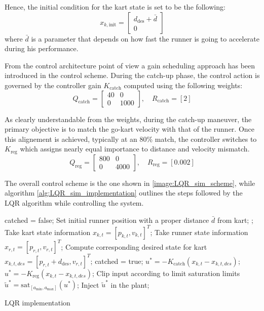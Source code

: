 \documentclass[a4paper,12pt,oneside]{book}
\begin{document}
Hence, the initial condition for the kart state is set to be the following:
\begin{equation}
    x_{k,\text{init}} =
    \begin{bmatrix}
        d_{\text{des}} + \bar{d} \\
        0
    \end{bmatrix}
\end{equation}
where $\bar{d}$ is a parameter that depends on how fast the runner is going to accelerate during his performance. 
 
\bigskip
From the control architecture point of view a gain scheduling approach has been introduced in the control scheme.
During the catch-up phase, the control action is governed by the controller gain $K_{\text{catch}}$ computed using the following weights: 
\begin{equation}
    Q_{\text{catch}} =
    \begin{bmatrix}
        40 & 0 \\
        0 & 1000
    \end{bmatrix},
    \quad
    R_{\text{catch}} = [2]
\end{equation}

As clearly understandable from the weights, during the catch-up maneuver, the primary objective is to match the go-kart velocity with  that of the runner.
Once this alignement is achieved, typically at an 80\% match, the controller switches to $K_{\text{reg}}$ which assigns nearly equal importance to distance and velocity mismatch.
\begin{equation}
    Q_{\text{reg}} =
    \begin{bmatrix}
        800 & 0 \\
        0 & 4000
    \end{bmatrix},
    \quad
    R_{\text{reg}} = [0.002]
\end{equation}

The overall control scheme is the one shown in \ref{image:LQR_sim_scheme}, while algorithm \ref{alg:LQR_sim_implementation} outlines the steps followed by the LQR algorithm while controlling the system.
\begin{algorithm}
\begin{algorithmic}[1]
	\State catched = false;
	\State Set initial runner position with a proper distance $\bar{d}$ from kart;
	;
		\State Take kart state information $x_{k,t} = [p_{k,t}, v_{k,t}]^T$;
		\State Take runner state information $x_{r,t} = [p_{r,t}, v_{r,t}]^T$;
		\State Compute corresponding desired state for kart $x_{k,t,des} = [p_{r,t} + d_{\text{des}}, v_{r,t}]^T$;
			\State catched = true;
		\EndIf
			\State $u^* = - K_{\text{catch}} (x_{k,t} - x_{k,t,des}) $;
		\Else 
			\State $u^* = - K_{\text{reg}} (x_{k,t} - x_{k,t,des}) $;
		\EndIf
		\State Clip input according to limit saturation limits $\tilde{u}^* = \text{sat}_{[a_{\min}, a_{\max}]} (u^*)$;
		\State Inject $\tilde{u}^*$ in the plant;
	\EndFor
\caption{LQR implementation}
\label{alg:LQR_sim_implementation}
\end{algorithmic}
\end{algorithm}
\end{document}
